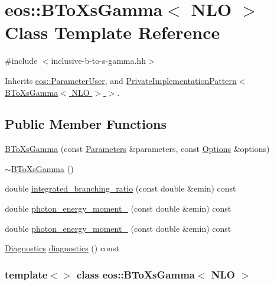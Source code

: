 \hypertarget{classeos_1_1BToXsGamma_3_01NLO_01_4}{
\section{eos::BToXsGamma$<$ NLO $>$ Class Template Reference}
\label{classeos_1_1BToXsGamma_3_01NLO_01_4}
}


{\ttfamily \#include $<$inclusive-\/b-\/to-\/s-\/gamma.hh$>$}

Inherits \hyperlink{classeos_1_1ParameterUser}{eos::ParameterUser}, and \hyperlink{classeos_1_1PrivateImplementationPattern}{PrivateImplementationPattern$<$ BToXsGamma$<$ NLO $>$ $>$}.\subsection*{Public Member Functions}
\begin{DoxyCompactItemize}
\item 
\hyperlink{classeos_1_1BToXsGamma_3_01NLO_01_4_a30c96f4eb1b642661414f1d87e730ee3}{BToXsGamma} (const \hyperlink{classeos_1_1Parameters}{Parameters} \&parameters, const \hyperlink{classeos_1_1Options}{Options} \&options)
\item 
\hyperlink{classeos_1_1BToXsGamma_3_01NLO_01_4_a992dc782baee80b815710a151c54f532}{$\sim$BToXsGamma} ()
\item 
double \hyperlink{classeos_1_1BToXsGamma_3_01NLO_01_4_ae00900386a68e7b65880ccb8145203fb}{integrated\_\-branching\_\-ratio} (const double \&emin) const 
\item 
double \hyperlink{classeos_1_1BToXsGamma_3_01NLO_01_4_ae72d7476e5a0e0184bb4b3d355509251}{photon\_\-energy\_\-moment\_} (const double \&emin) const 
\item 
double \hyperlink{classeos_1_1BToXsGamma_3_01NLO_01_4_a0db4100d9dc7e9678ecc73a0c5c8e591}{photon\_\-energy\_\-moment\_} (const double \&emin) const 
\item 
\hyperlink{classeos_1_1Diagnostics}{Diagnostics} \hyperlink{classeos_1_1BToXsGamma_3_01NLO_01_4_af39756d6216354324d53d410a3b11949}{diagnostics} () const 
\end{DoxyCompactItemize}
\subsubsection*{template$<$$>$ class eos::BToXsGamma$<$ NLO $>$}



